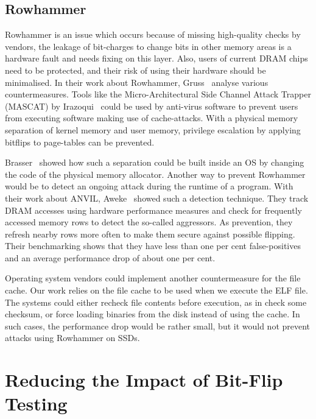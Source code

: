 \subsection{Rowhammer}

Rowhammer is an issue which occurs because of missing high-quality checks by
vendors, the leakage of bit-charges to change bits in other memory areas is a
hardware fault and needs fixing on this layer. Also, users of current DRAM
chips need to be protected, and their risk of using their hardware should be
minimalised. In their work about Rowhammer, Gruss~\etal\cite{flipinthewall}
analyse various countermeasures. Tools like the Micro-Architectural Side
Channel Attack Trapper (MASCAT) by Irazoqui~\etal\cite{mascat} could be used by
anti-virus software to prevent users from executing software making use of
cache-attacks. With a physical memory separation of kernel memory and user
memory, privilege escalation by applying bitflips to page-tables can be
prevented.

Brasser~\etal\cite{canttouch} showed how such a separation could be built
inside an OS by changing the code of the physical memory allocator. Another
way to prevent Rowhammer would be to detect an ongoing attack during the runtime
of a program. With their work about ANVIL, Aweke~\etal\cite{anvil} showed such
a detection technique. They track DRAM accesses using hardware performance
measures and check for frequently accessed memory rows to detect the so-called
aggressors. As prevention, they refresh nearby rows more often to make them
secure against possible flipping. Their benchmarking shows that they have less
than one per cent false-positives and an average performance drop of about one
per cent.

Operating system vendors could implement another countermeasure for the file
cache. Our work relies on the file cache to be used when we execute the ELF
file. The systems could either recheck file contents before execution, as
in check some checksum, or force loading binaries from the disk instead of
using the cache. In such cases, the performance drop would be rather small, but
it would not prevent attacks using Rowhammer on SSDs.

\section{Reducing the Impact of Bit-Flip Testing}

